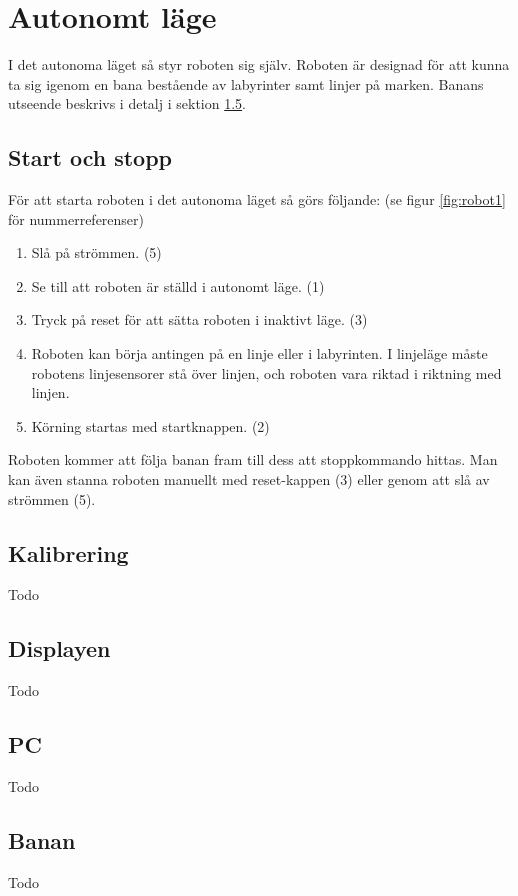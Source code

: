 
%
%

\section{Autonomt läge}
I det autonoma läget så styr roboten sig själv. Roboten är designad för att kunna ta sig igenom en bana bestående av labyrinter samt linjer på marken. Banans utseende beskrivs i detalj i sektion \ref{sec:banan}.

\subsection{Start och stopp}
För att starta roboten i det autonoma läget så görs följande: (se figur \ref{fig:robot1} för nummerreferenser)

\begin{enumerate}
\item Slå på strömmen. (5)
\item Se till att roboten är ställd i autonomt läge. (1)
\item Tryck på reset för att sätta roboten i inaktivt läge. (3)
\item Roboten kan börja antingen på en linje eller i labyrinten. I linjeläge måste robotens linjesensorer stå över linjen, och roboten vara riktad i riktning med linjen. 
\item Körning startas med startknappen. (2)
\end{enumerate}

Roboten kommer att följa banan fram till dess att stoppkommando hittas. Man kan även stanna roboten manuellt med reset-kappen (3) eller genom att slå av strömmen (5). 

\subsection{Kalibrering}
Todo

\subsection{Displayen}
Todo

\subsection{PC}
Todo

\subsection{Banan}
\label{sec:banan}
Todo
